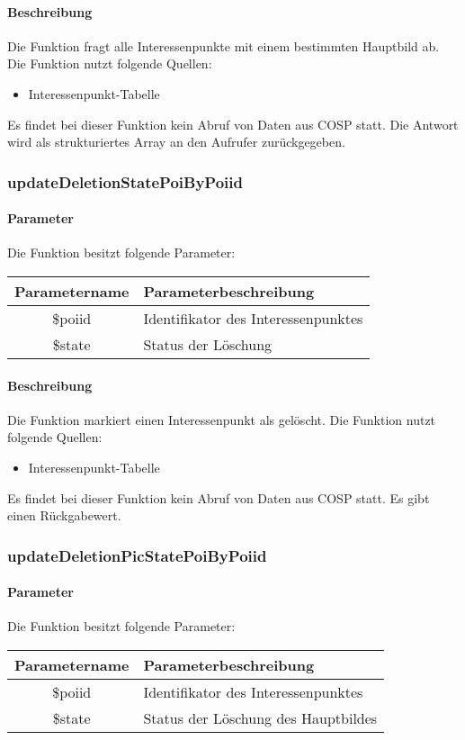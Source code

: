 \paragraph{Beschreibung} Die Funktion fragt alle Interessenpunkte mit einem bestimmten Hauptbild ab. Die Funktion nutzt folgende Quellen:
\begin{itemize}
	\item Interessenpunkt-Tabelle
\end{itemize}
Es findet bei dieser Funktion kein Abruf von Daten aus {\glqq COSP\grqq} statt. Die Antwort wird als strukturiertes Array an den Aufrufer zurückgegeben.
\subsubsection{updateDeletionStatePoiByPoiid}
\paragraph{Parameter} Die Funktion besitzt folgende Parameter:
\begin{table}[H]
	\begin{tabular}{|c|p{11cm}|}
		\hline
		\textbf{Parametername} & \textbf{Parameterbeschreibung} \\ \hline
		\$poiid & Identifikator des Interessenpunktes \\ \hline
		\$state & Status der Löschung \\ \hline
	\end{tabular}
\end{table}
\paragraph{Beschreibung} Die Funktion markiert einen Interessenpunkt als gelöscht. Die Funktion nutzt folgende Quellen:
\begin{itemize}
	\item Interessenpunkt-Tabelle
\end{itemize}
Es findet bei dieser Funktion kein Abruf von Daten aus {\glqq COSP\grqq} statt. Es gibt einen Rückgabewert.
\subsubsection{updateDeletionPicStatePoiByPoiid}
\paragraph{Parameter} Die Funktion besitzt folgende Parameter:
\begin{table}[H]
	\begin{tabular}{|c|p{11cm}|}
		\hline
		\textbf{Parametername} & \textbf{Parameterbeschreibung} \\ \hline
		\$poiid & Identifikator des Interessenpunktes \\ \hline
		\$state & Status der Löschung des Hauptbildes \\ \hline
	\end{tabular}
\end{table}
